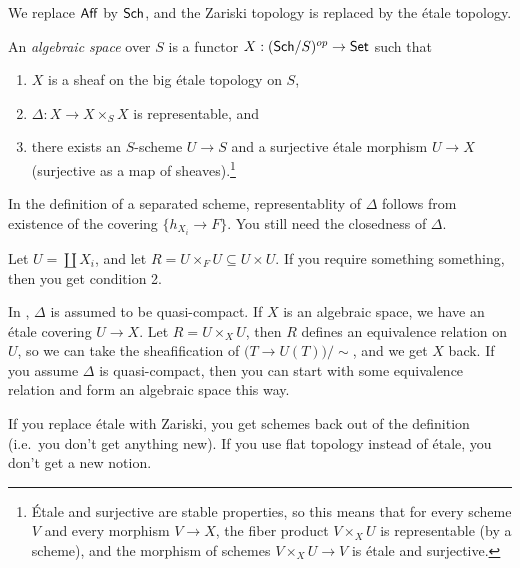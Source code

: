
We replace $\text{\sf Aff}$ by $\text{\sf Sch}$, and the Zariski topology is replaced by the \'etale topology.

\begin{definition}
 An \emph{algebraic space} over $S$ is a functor $X:(\text{\sf Sch}/S)^{op}\to \text{\sf Set}$ such that
 \begin{enumerate}
  \item $X$ is a sheaf on the big \'etale topology on $S$,
  \item $\Delta:X\to X\times_S X$ is representable, and
  \item there exists an $S$-scheme $U\to S$ and a surjective \'etale morphism $U\to X$ (surjective as a map of sheaves).\footnote{\'Etale and surjective are stable properties, so this means that for every scheme $V$ and every morphism $V\to X$, the fiber product $V\times_X U$ is representable (by a scheme), and the morphism of schemes $V\times_X U\to V$ is \'etale and surjective.}
 \end{enumerate}
\end{definition}
\begin{remark}
 In the definition of a separated scheme, representablity of $\Delta$ follows from existence of the covering $\{h_{X_i}\to F\}$. You still need the closedness of $\Delta$.

 Let $U=\coprod X_i$, and let $R=U\times_F U\subseteq U\times U$. If you require something something\anton{}, then you get condition 2.
\end{remark}
\begin{remark}
 In \cite{Knutson}, $\Delta$ is assumed to be quasi-compact. If $X$ is an algebraic space, we have an \'etale covering $U\to X$. Let $R=U\times_X U$, then $R$ defines an equivalence relation on $U$, so we can take the sheafification of $\bigl(T\to U(T)\bigr)/\sim$, and we get $X$ back. If you assume $\Delta$ is quasi-compact, then you can start with some equivalence relation and form an algebraic space this way.
\end{remark}

If you replace \'etale with Zariski, you get schemes back out of the definition (i.e.~you don't get anything new). If you use flat topology instead of \'etale, you don't get a new notion. 

